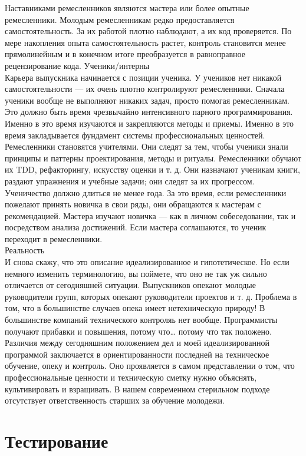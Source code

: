 \documentclass{../industrial-development}
\begin{document}
Наставниками ремесленников являются мастера или более опытные ремесленники. Молодым ремесленникам редко предоставляется самостоятельность. За их работой плотно наблюдают, а их код проверяется. По мере накопления опыта самостоятельность растет, контроль становится менее прямолинейным и в конечном итоге преобразуется в равноправное рецензирование кода.
Ученики/интерны\\
Карьера выпускника начинается с позиции ученика. У учеников нет никакой самостоятельности — их очень плотно контролируют ремесленники. Сначала ученики вообще не выполняют никаких задач, просто помогая ремесленникам. Это должно быть время чрезвычайно интенсивного парного программирования. Именно в это время изучаются и закрепляются методы и приемы. Именно в это время закладывается фундамент системы профессиональных ценностей.\\
Ремесленники становятся учителями. Они следят за тем, чтобы ученики знали принципы и паттерны проектирования, методы и ритуалы. Ремесленники обучают их TDD, рефакторингу, искусству оценки и т. д. Они назначают ученикам книги, раздают упражнения и учебные задачи; они следят за их прогрессом.\\
Ученичество должно длиться не менее года. За это время, если ремесленники пожелают принять новичка в свои ряды, они обращаются к мастерам с рекомендацией. Мастера изучают новичка — как в личном собеседовании, так и посредством анализа достижений. Если мастера соглашаются, то ученик переходит в ремесленники.\\
Реальность\\
И снова скажу, что это описание идеализированное и гипотетическое. Но если немного изменить терминологию, вы поймете, что оно не так уж сильно отличается от сегодняшней ситуации. Выпускников опекают молодые руководители групп, которых опекают руководители проектов и т. д. Проблема в том, что в большинстве случаев опека имеет нетехническую природу! В большинстве компаний технического контроляь нет вообще. Программисты получают прибавки и повышения, потому
что… потому что так положено.\\
Различия между сегодняшним положением дел и моей идеализированной программой заключается в ориентированности последней на техническое обучение, опеку и контроль. Оно проявляется в самом
представлении о том, что профессиональные ценности и техническую сметку нужно объяснять, культивировать и взращивать. В нашем современном стерильном подходе отсутствует ответственность старших за обучение молодежи.


\section{Тестирование}
\end{document}
